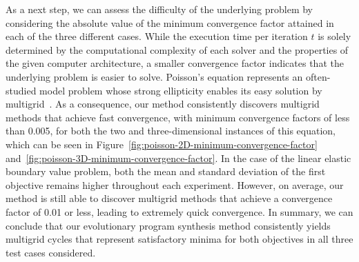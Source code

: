As a next step, we can assess the difficulty of the underlying problem by considering the absolute value of the minimum convergence factor attained in each of the three different cases.
While the execution time per iteration $t$ is solely determined by the computational complexity of each solver and the properties of the given computer architecture, a smaller convergence factor indicates that the underlying problem is easier to solve.
Poisson's equation represents an often-studied model problem whose strong ellipticity enables its easy solution by multigrid~\cite{trottenberg2000multigrid}.
As a consequence, our method consistently discovers multigrid methods that achieve fast convergence, with minimum convergence factors of less than 0.005, for both the two and three-dimensional instances of this equation, which can be seen in Figure~\ref{fig:poisson-2D-minimum-convergence-factor} and~\ref{fig:poisson-3D-minimum-convergence-factor}.
In the case of the linear elastic boundary value problem, both the mean and standard deviation of the first objective remains higher throughout each experiment.
However, on average, our method is still able to discover multigrid methods that achieve a convergence factor of 0.01 or less, leading to extremely quick convergence.
In summary, we can conclude that our evolutionary program synthesis method consistently yields multigrid cycles that represent satisfactory minima for both objectives in all three test cases considered.

